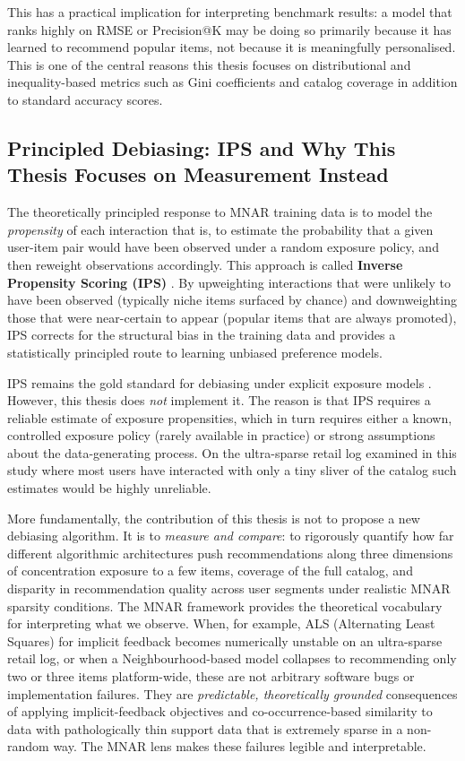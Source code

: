 \documentclass[11pt,a4paper]{report}
\begin{document}
This has a practical implication for interpreting benchmark results: a model that ranks highly on RMSE or Precision@K may be doing so primarily because it has learned to recommend popular items, not because it is meaningfully personalised. This is one of the central reasons this thesis focuses on distributional and inequality-based metrics such as Gini coefficients and catalog coverage in addition to standard accuracy scores.

\subsection*{Principled Debiasing: IPS and Why This Thesis Focuses on Measurement Instead}

The theoretically principled response to MNAR training data is to model the \emph{propensity} of each interaction that is, to estimate the probability that a given user-item pair would have been observed under a random exposure policy, and then reweight observations accordingly. This approach is called \textbf{Inverse Propensity Scoring (IPS)} \citep{schnabel2016ips}. By upweighting interactions that were unlikely to have been observed (typically niche items surfaced by chance) and downweighting those that were near-certain to appear (popular items that are always promoted), IPS corrects for the structural bias in the training data and provides a statistically principled route to learning unbiased preference models.

IPS remains the gold standard for debiasing under explicit exposure models \citep{schnabel2016ips, steck2010training}. However, this thesis does \emph{not} implement it. The reason is that IPS requires a reliable estimate of exposure propensities, which in turn requires either a known, controlled exposure policy (rarely available in practice) or strong assumptions about the data-generating process. On the ultra-sparse retail log examined in this study where most users have interacted with only a tiny sliver of the catalog such estimates would be highly unreliable.

More fundamentally, the contribution of this thesis is not to propose a new debiasing algorithm. It is to \emph{measure and compare}: to rigorously quantify how far different algorithmic architectures push recommendations along three dimensions of concentration exposure to a few items, coverage of the full catalog, and disparity in recommendation quality across user segments under realistic MNAR sparsity conditions. The MNAR framework provides the theoretical vocabulary for interpreting what we observe. When, for example, ALS (Alternating Least Squares) for implicit feedback becomes numerically unstable on an ultra-sparse retail log, or when a Neighbourhood-based model collapses to recommending only two or three items platform-wide, these are not arbitrary software bugs or implementation failures. They are \emph{predictable, theoretically grounded} consequences of applying implicit-feedback objectives and co-occurrence-based similarity to data with pathologically thin support data that is extremely sparse in a non-random way. The MNAR lens makes these failures legible and interpretable.
\end{document}
